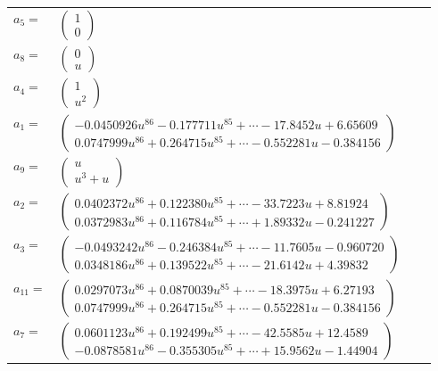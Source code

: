 \documentclass[1p]{elsarticle_modified}
\theoremstyle{definition}
\begin{document}
\begin{tabular}{m{7pt} m{180pt} m{7pt} m{180pt} }
\flushright $a_{5}=$&$\begin{pmatrix}1\\0\end{pmatrix}$ \\
\flushright $a_{8}=$&$\begin{pmatrix}0\\u\end{pmatrix}$ \\
\flushright $a_{4}=$&$\begin{pmatrix}1\\u^2\end{pmatrix}$ \\
\flushright $a_{1}=$&$\begin{pmatrix}-0.0450926 u^{86}-0.177711 u^{85}+\cdots-17.8452 u+6.65609\\0.0747999 u^{86}+0.264715 u^{85}+\cdots-0.552281 u-0.384156\end{pmatrix}$ \\
\flushright $a_{9}=$&$\begin{pmatrix}u\\u^3+u\end{pmatrix}$ \\
\flushright $a_{2}=$&$\begin{pmatrix}0.0402372 u^{86}+0.122380 u^{85}+\cdots-33.7223 u+8.81924\\0.0372983 u^{86}+0.116784 u^{85}+\cdots+1.89332 u-0.241227\end{pmatrix}$ \\
\flushright $a_{3}=$&$\begin{pmatrix}-0.0493242 u^{86}-0.246384 u^{85}+\cdots-11.7605 u-0.960720\\0.0348186 u^{86}+0.139522 u^{85}+\cdots-21.6142 u+4.39832\end{pmatrix}$ \\
\flushright $a_{11}=$&$\begin{pmatrix}0.0297073 u^{86}+0.0870039 u^{85}+\cdots-18.3975 u+6.27193\\0.0747999 u^{86}+0.264715 u^{85}+\cdots-0.552281 u-0.384156\end{pmatrix}$ \\
\flushright $a_{7}=$&$\begin{pmatrix}0.0601123 u^{86}+0.192499 u^{85}+\cdots-42.5585 u+12.4589\\-0.0878581 u^{86}-0.355305 u^{85}+\cdots+15.9562 u-1.44904\end{pmatrix}$ \\

\end{tabular}
\end{document}
